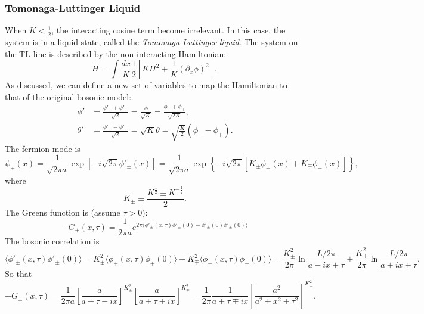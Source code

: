 \documentclass{SciPost}
\begin{document}
\subsubsection{Tomonaga-Luttinger Liquid}
When $K<\frac{1}{2}$, the interacting cosine term become irrelevant.
In this case, the system is in a liquid state, called the \textit{Tomonaga-Luttinger liquid}.
The system on the TL line is described by the non-interacting Hamiltonian:
\begin{equation}
	H = \int \frac{dx}{K} \frac{1}{2}\left[K \Pi^2 + \frac{1}{K}(\partial_x\phi)^2 \right],
\end{equation}
As discussed, we can define a new set of variables to map the Hamiltonian to that of the original bosonic model:
\begin{equation}
\begin{aligned}
	\phi' &= \frac{\phi'_-+\phi'_+}{\sqrt 2} = \frac{\phi}{\sqrt{K}} = \frac{\phi_-+\phi_+}{\sqrt{2K}}, \\
	\theta' &= \frac{\phi'_--\phi'_+}{\sqrt 2} = \sqrt{K} \theta = \sqrt{\frac{K}{2}}(\phi_--\phi_+).
\end{aligned}
\end{equation}
The fermion mode is
\begin{equation}
	\psi_{\pm}(x) = \frac{1}{\sqrt{2\pi a}} \exp\left[-i\sqrt{2\pi} \phi'_{\pm}(x) \right]
	= \frac{1}{\sqrt{2\pi a}} \exp\left\{-i\sqrt{2\pi} \left[K_\pm \phi_+(x)+ K_\mp \phi_-(x) \right]\right\},
\end{equation}
where 
\begin{equation}
	K_\pm \equiv \frac{K^{\frac{1}{2}} \pm K^{-\frac{1}{2}}}{2}.
\end{equation}
The Greens function is (assume $\tau>0$):
\begin{equation}
	-G_{\pm}(x,\tau) 
	= \frac{1}{2\pi a} e^{2\pi \langle \phi'_\pm(x,\tau)\phi'_\pm(0) - \phi'_\pm(0)\phi'_\pm(0) \rangle}
\end{equation}
The bosonic correlation is
\begin{equation}
	\langle \phi'_\pm(x,\tau)\phi'_\pm(0) \rangle
	= K_\pm^2 \langle \phi_+(x,\tau)\phi_+(0)\rangle + K_\mp^2 \langle\phi_-(x,\tau)\phi_-(0)\rangle 
	= \frac{K_\pm^2}{2\pi}\ln \frac{L/2\pi}{a-ix+\tau} + \frac{K_\mp^2}{2\pi}\ln \frac{L/2\pi}{a+ix +\tau}.
\end{equation}
So that
\begin{equation}
	-G_{\pm}(x,\tau) 
	= \frac{1}{2\pi a} \left[\frac{a}{a + \tau - ix}\right]^{K_\pm^2} \left[\frac{a}{a + \tau + i x}\right]^{K_\mp^2} 
	= \frac{1}{2\pi} \frac{1}{a + \tau \mp ix} \left[\frac{a^2}{a^2+x^2+\tau^2}\right]^{K_-^2}.
\end{equation}
\end{document}

